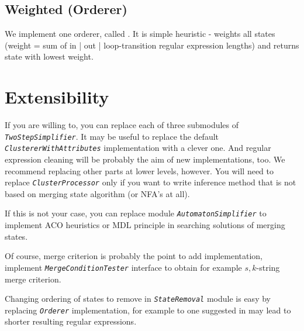 \documentclass[a4paper,10pt,oneside]{article}
\newcommand{\code}[1]{\texttt{\StrSubstitute{#1}{.}{.\.}}}
\def\.{\discretionary{}{}{}}
\newcommand{\jmodule}[1]{\texttt{\textit{#1}}}
\begin{document}
\subsection{Weighted (Orderer)} \label{section_Weighted}
We implement one orderer, called \code{Weighted}.
It is simple heuristic - weights all states (weight = sum of {in | out | loop}-transition regular expression lengths) and returns state with lowest weight.

\section{Extensibility}
If you are willing to, you can replace each of three submodules of \jmodule{TwoStepSimplifier}.
It may be useful to replace the default \jmodule{ClustererWithAttributes} implementation with a clever one.
And regular expression cleaning will be probably the aim of new implementations, too.
We recommend replacing other parts at lower levels, however.
You will need to replace \jmodule{ClusterProcessor} only if you want to write inference method that is not based on merging state algorithm (or NFA's at all).

If this is not your case, you can replace module \jmodule{AutomatonSimplifier} to implement ACO heuristics or MDL principle in searching solutions of merging states.

Of course, merge criterion is probably the point to add implementation, implement \jmodule{MergeConditionTester} interface to obtain for example $s,k$-string merge criterion.

Changing ordering of states to remove in \jmodule{StateRemoval} module is easy by replacing \jmodule{Orderer} implementation, for example to one suggested in \cite{1224321} may lead to shorter resulting regular expressions.
\end{document}
